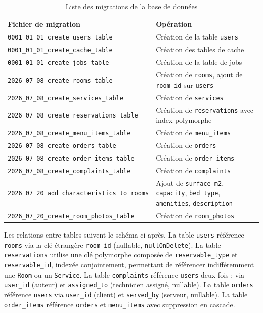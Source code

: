 \documentclass[12pt,a4paper]{report}
\begin{document}
\begin{table}[h]
    \centering
    \caption{Liste des migrations de la base de données}
    \label{tab:migrations}
    \begin{tabular}{|l|l|}
        \hline
        \textbf{Fichier de migration} & \textbf{Opération} \\
        \hline
        \texttt{0001\_01\_01\_create\_users\_table} & Création de la table \texttt{users} \\
        \hline
        \texttt{0001\_01\_01\_create\_cache\_table} & Création des tables de cache \\
        \hline
        \texttt{0001\_01\_01\_create\_jobs\_table} & Création de la table de jobs \\
        \hline
        \texttt{2026\_07\_08\_create\_rooms\_table} & Création de \texttt{rooms}, ajout de \texttt{room\_id} sur \texttt{users} \\
        \hline
        \texttt{2026\_07\_08\_create\_services\_table} & Création de \texttt{services} \\
        \hline
        \texttt{2026\_07\_08\_create\_reservations\_table} & Création de \texttt{reservations} avec index polymorphe \\
        \hline
        \texttt{2026\_07\_08\_create\_menu\_items\_table} & Création de \texttt{menu\_items} \\
        \hline
        \texttt{2026\_07\_08\_create\_orders\_table} & Création de \texttt{orders} \\
        \hline
        \texttt{2026\_07\_08\_create\_order\_items\_table} & Création de \texttt{order\_items} \\
        \hline
        \texttt{2026\_07\_08\_create\_complaints\_table} & Création de \texttt{complaints} \\
        \hline
        \texttt{2026\_07\_20\_add\_characteristics\_to\_rooms} & Ajout de \texttt{surface\_m2}, \texttt{capacity}, \texttt{bed\_type}, \texttt{amenities}, \texttt{description} \\
        \hline
        \texttt{2026\_07\_20\_create\_room\_photos\_table} & Création de \texttt{room\_photos} \\
        \hline
    \end{tabular}
\end{table}

Les relations entre tables suivent le schéma ci-après. La table
\texttt{users} référence \texttt{rooms} via la clé étrangère
\texttt{room\_id} (nullable, \texttt{nullOnDelete}). La table
\texttt{reservations} utilise une clé polymorphe composée de
\texttt{reservable\_type} et \texttt{reservable\_id}, indexée
conjointement, permettant de référencer indifféremment une
\texttt{Room} ou un \texttt{Service}. La table \texttt{complaints}
référence \texttt{users} deux fois : via \texttt{user\_id} (auteur)
et \texttt{assigned\_to} (technicien assigné, nullable). La table
\texttt{orders} référence \texttt{users} via \texttt{user\_id} (client)
et \texttt{served\_by} (serveur, nullable). La table \texttt{order\_items}
référence \texttt{orders} et \texttt{menu\_items} avec suppression en
cascade.
\end{document}
